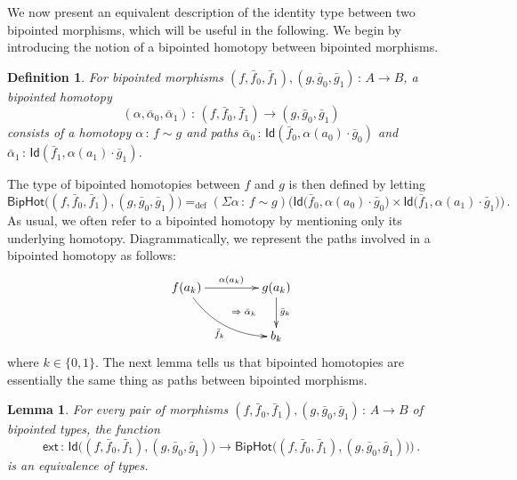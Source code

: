 \documentclass[10pt,a4paper,oneside,reqno]{amsart}
\theoremstyle{mythm}
\newtheorem{lemma}[theorem]{Lemma}
\theoremstyle{mydef}
\newtheorem{definition}[theorem]{Definition}
\theoremstyle{myrmk}
\newcommand{\defeq}{=_{\mathrm{def}}}
\newcommand{\co}{\,{:}\,}
\newcommand{\ct}{\cdot}
\newcommand{\ext}{\mathsf{ext}}
\newcommand{\Id}{\mathsf{Id}}
\newcommand{\BipHot}{\mathsf{BipHot}}
\begin{document}
We now present an equivalent description of the identity type between two bipointed morphisms, which 
will be useful in the following. We begin by introducing the notion of a bipointed homotopy between bipointed morphisms.





\begin{definition} \label{thm:biphomotopy} For bipointed morphisms $(f, \bar{f}_0, \bar{f}_1) , (g, \bar{g}_0, \bar{g}_1) \co A \to B$, 
a \emph{bipointed homotopy} 
\[
(\alpha, \bar{\alpha}_0, \bar{\alpha}_1) \co (f, \bar{f}_0, \bar{f}_1) \to  (g, \bar{g}_0, \bar{g}_1)
\] 
consists of a homotopy $\alpha \co  f \sim g$ and paths
$\bar{\alpha}_0 \co \Id(  \bar{f}_0 , \alpha(a_0)  \cdot \bar{g}_0)$ and $\bar{\alpha}_1 \co \Id(
\bar{f}_1 , \alpha(a_1) \cdot \bar{g}_1)$. 
\end{definition}

The type of bipointed homotopies between $f$ and $g$ is then defined by letting
\[
 \BipHot  \big( (f,\bar{f}_0, \bar{f}_1), (g, \bar{g}_0, \bar{g}_1) \big)   \defeq   
 (\Sigma \alpha \co f \sim g)  \big( 
  \Id\big( \bar{f}_0 ,  \alpha(a_0)  \ct \bar{g}_0 \big) \times 
  \Id \big( \bar{f}_1,  \alpha(a_1) \ct  \bar{g}_1 \big) \big) \, .
\]
As usual, we often refer to a bipointed homotopy by mentioning only its underlying homotopy.
Diagrammatically, we represent the paths  involved in a bipointed homotopy as follows:
\[
\xymatrix@C=1.5cm{
f(a_k) \ar[r]^{\alpha(a_k)}  \ar@/_1pc/[dr]_{\bar{f}_k}  
\ar@{}[dr]|{\qquad \Rightarrow \; \bar{\alpha}_k}  & g(a_k) \ar[d]^{\bar{g}_k}  \\ 
 & b_k }
  \] 
where $k \in \{ 0, 1\}$. The next lemma tells us that bipointed homotopies are essentially the
same thing as paths between bipointed morphisms.


\begin{lemma} \label{BoolHomSpace} 
For every  pair of morphisms $(f, \bar{f}_0, \bar{f}_1), (g, \bar{g}_0, \bar{g}_1) \co A \to B$ of bipointed types, the
function 
\[
\ext \co \Id \big( (f, \bar{f}_0, \bar{f}_1), (g, \bar{g}_0, \bar{g}_1) \big) \to 
\BipHot\big( (f, \bar{f}_0, \bar{f}_1), (g, \bar{g}_0, \bar{g}_1) ) \big) \, .
\]
is an equivalence of types.
\end{lemma}
\end{document}
